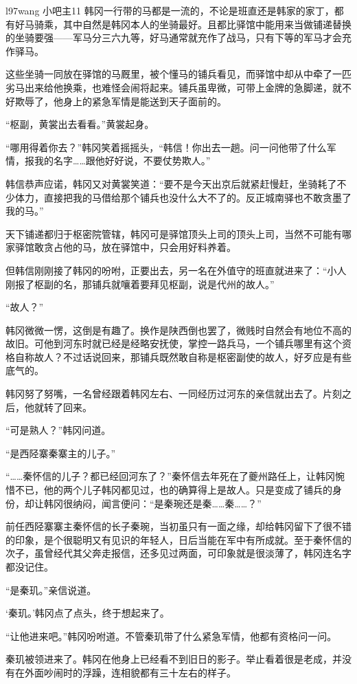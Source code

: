 l97wang
小吧主11
韩冈一行带的马都是一流的，不论是班直还是韩家的家丁，都有好马骑乘，其中自然是韩冈本人的坐骑最好。且都比驿馆中能用来当做铺递替换的坐骑要强——军马分三六九等，好马通常就充作了战马，只有下等的军马才会充作驿马。

这些坐骑一同放在驿馆的马厩里，被个懂马的铺兵看见，而驿馆中却从中牵了一匹劣马出来给他换乘，也难怪会闹将起来。铺兵虽卑微，可带上金牌的急脚递，就不好欺辱了，他身上的紧急军情是能送到天子面前的。

“枢副，黄裳出去看看。”黄裳起身。

“哪用得着你去？”韩冈笑着摇摇头，“韩信！你出去一趟。问一问他带了什么军情，报我的名字……跟他好好说，不要仗势欺人。”

韩信恭声应诺，韩冈又对黄裳笑道：“要不是今天出京后就紧赶慢赶，坐骑耗了不少体力，直接把我的马借给那个铺兵也没什么大不了的。反正城南驿也不敢贪墨了我的马。”

天下铺递都归于枢密院管辖，韩冈可是驿馆顶头上司的顶头上司，当然不可能有哪家驿馆敢贪占他的马，放在驿馆中，只会用好料养着。

但韩信刚刚接了韩冈的吩咐，正要出去，另一名在外值守的班直就进来了：“小人刚报了枢副的名，那铺兵就嚷着要拜见枢副，说是代州的故人。”

“故人？”

韩冈微微一愣，这倒是有趣了。换作是陕西倒也罢了，微贱时自然会有地位不高的故旧。可他到河东时就已经是经略安抚使，掌控一路兵马，一个铺兵哪里有这个资格自称故人？不过话说回来，那铺兵既然敢自称是枢密副使的故人，好歹应是有些底气的。

韩冈努了努嘴，一名曾经跟着韩冈左右、一同经历过河东的亲信就出去了。片刻之后，他就转了回来。

“可是熟人？”韩冈问道。

“是西陉寨秦寨主的儿子。”

“……秦怀信的儿子？都已经回河东了？”秦怀信去年死在了夔州路任上，让韩冈惋惜不已，他的两个儿子韩冈都见过，也的确算得上是故人。只是变成了铺兵的身份，却让韩冈很纳闷，闻言便问：“是秦琬还是秦……秦……？”

前任西陉寨寨主秦怀信的长子秦琬，当初虽只有一面之缘，却给韩冈留下了很不错的印象，是个很聪明又有见识的年轻人，日后当能在军中有所成就。至于秦怀信的次子，虽曾经代其父奔走报信，还多见过两面，可印象就是很淡薄了，韩冈连名字都没记住。

“是秦玑。”亲信说道。

‘秦玑。’韩冈点了点头，终于想起来了。

“让他进来吧。”韩冈吩咐道。不管秦玑带了什么紧急军情，他都有资格问一问。

秦玑被领进来了。韩冈在他身上已经看不到旧日的影子。举止看着很是老成，并没有在外面吵闹时的浮躁，连相貌都有三十左右的样子。

